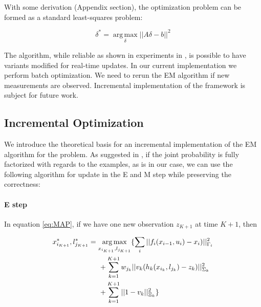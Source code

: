 With some derivation %
(Appendix section), the optimization problem can be formed as a standard least-squares problem:


\begin{equation}
\delta^* = \operatorname*{arg\,max}_\delta||A\delta - b||^2
\label{eq:optimization}
\end{equation}


The algorithm, while reliable as shown in experiments in \cite{haehnel03iros}, is possible to have variants modified for real-time updates. In our current implementation we perform batch optimization. We need to rerun the EM algorithm if new measurements are observed. Incremental implementation of the framework is subject for future work.

\subsection{Incremental Optimization}
We introduce the theoretical basis for an incremental implementation of the EM algorithm for the problem. As suggested in \cite{neal1998EM}, if the joint probability is fully factorized with regards to the examples, as is in our case, we can use the following algorithm for update in the E and M step while preserving the correctness:

\paragraph{E step} 
In equation \ref{eq:MAP}, if we have one new observation $z_{K+1}$ at time $K+1$, then

\begin{equation}
\begin{aligned}
x_{i_{K+1}}^*, l_{j_{K+1}}^*  
&= \operatorname*{arg\,max}_{ x_{i_{K+1}}, l_{j_{K+1}}} \{ 
\sum_{i}||f_i(x_{i-1}, u_i) - x_i)||^2_{\Gamma_i} \\
&\hspace{0.5cm}+ \sum_{k=1}^{K+1} w_{j_k}||v_k(h_k(x_{i_k}, l_{j_k}) - z_k)||^2_{\Sigma_k} \\ 
&\hspace{0.5cm}+ \sum_{k=1}^{K+1}||1-v_k||^2_{\Xi_k} \}
\end{aligned}
\label{eq:facMAP}
\end{equation}

